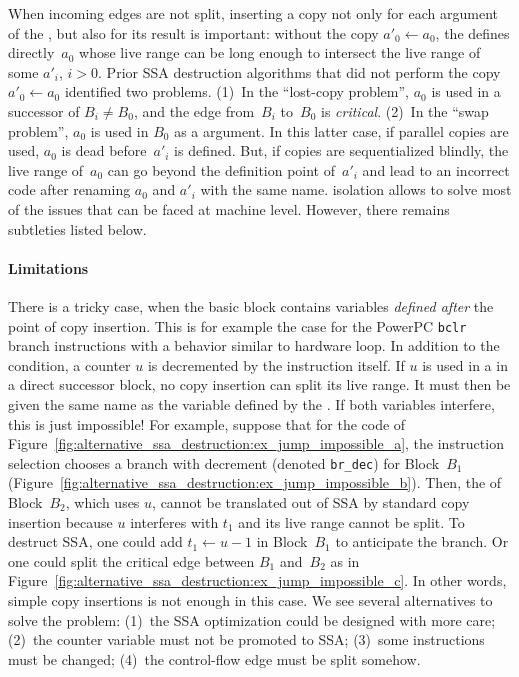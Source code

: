 When incoming edges are not split, inserting a copy not only for each argument of the \phifun, but also for its result is important: 
without the copy $a'_0\gets a_0$, the \phifun defines directly~$a_0$ whose live range can be long enough to intersect the live range of some $a'_i$, $i>0$. 
Prior SSA destruction algorithms that did not perform the copy  $a'_0\gets a_0$ identified two problems.
(1)~In the ``lost-copy problem'',  $a_0$ is used in a successor of $B_i \neq B_0$, and the edge from~$B_i$ to~$B_0$ is \emph{critical}.
(2)~In the ``swap problem'', $a_0$ is used in $B_0$ as a \phifun argument. 
In this latter case, if parallel copies are used, $a_0$ is dead before~$a'_i$ is defined.
But, if copies are sequentialized blindly, the live range of~$a_0$ can go beyond the definition point of~$a'_i$ and lead to an incorrect code after renaming $a_0$ and $a'_i$ with the same name. 
\phinode isolation allows to solve most of the issues that can be faced at machine level. 
However, there remains subtleties listed below.


\paragraph{Limitations}
There is a tricky case, when the basic block contains variables \emph{defined after} the point of copy insertion. 
This is for example the case for the PowerPC \texttt{bclr} branch instructions with a behavior similar to hardware loop. 
In addition to the condition, a counter $u$ is decremented by the instruction itself. 
If $u$ is used in a \phifun in a direct successor block, no copy insertion can split its live range. 
It must then be given the same name as the variable defined by the \phifun. 
If both variables interfere, this is just impossible! 
For example, suppose that for the code of Figure~\ref{fig:alternative_ssa_destruction:ex_jump_impossible_a}, the instruction selection chooses a branch with decrement (denoted \texttt{br\_dec}) for Block~$B_1$ (Figure~\ref{fig:alternative_ssa_destruction:ex_jump_impossible_b}). 
Then, the \phifun of Block~$B_2$, which uses $u$, cannot be translated out of SSA by standard copy insertion because $u$ interferes with $t_1$ and its live range cannot be split. 
To destruct SSA, one could add $t_1\gets u-1$ in Block~$B_1$ to anticipate the branch. 
Or one could split the critical edge between $B_1$ and~$B_2$ as in Figure~\ref{fig:alternative_ssa_destruction:ex_jump_impossible_c}. 
In other words, simple copy insertions is not enough in this case.
We see several alternatives to solve the problem:
(1)~the SSA optimization could be designed with more care;
(2)~the counter variable must not be promoted to SSA;
(3)~some instructions must be changed;
(4)~the control-flow edge must be split somehow. 

